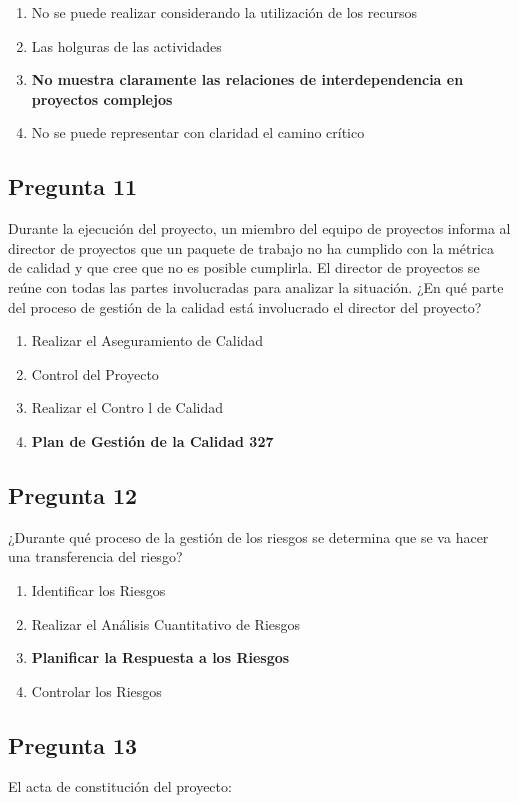 \documentclass[11pt,a4paper]{article}
\begin{document}
\begin{enumerate}[label=\alph*)]
  \item No se puede realizar considerando la utilización de los recursos
  \item Las holguras de las actividades
  \item \textbf{No muestra claramente las relaciones de interdependencia en proyectos complejos}
  \item No se puede representar con claridad el camino crítico
\end{enumerate}

\subsection*{Pregunta 11}
Durante la ejecución del proyecto, un miembro del equipo de proyectos informa al director de proyectos que un paquete de trabajo no ha cumplido con la métrica de calidad y que cree que no es posible cumplirla. El director de proyectos se reúne con todas las partes involucradas para analizar la situación. ¿En qué parte del proceso de gestión de la calidad está involucrado el director del proyecto?

\begin{enumerate}[label=\alph*)]
  \item Realizar el Aseguramiento de Calidad
  \item Control del Proyecto
  \item Realizar el Contro l de Calidad
  \item \textbf{Plan de Gestión de la Calidad 327}
\end{enumerate}

\subsection*{Pregunta 12}
¿Durante qué proceso de la gestión de los riesgos se determina que se va hacer una transferencia del riesgo?

\begin{enumerate}[label=\alph*)]
  \item Identificar los Riesgos
  \item Realizar el Análisis Cuantitativo de Riesgos
  \item \textbf{Planificar la Respuesta a los Riesgos}
  \item Controlar los Riesgos
\end{enumerate}

\subsection*{Pregunta 13}
El acta de constitución del proyecto:
\end{document}
